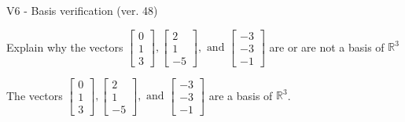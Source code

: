 \begin{exercise}
  \begin{exerciseTitle}V6 - Basis verification (ver. 48)\end{exerciseTitle}
  \begin{exerciseStatement}
    Explain why the vectors \(\left[\begin{array}{r}
0 \\
1 \\
3
\end{array}\right] , \left[\begin{array}{r}
2 \\
1 \\
-5
\end{array}\right] , \text{ and } \left[\begin{array}{r}
-3 \\
-3 \\
-1
\end{array}\right]\) are or are not a basis of \(\mathbb{R}^3\)	


  \end{exerciseStatement}
  \begin{exerciseAnswer}
   The vectors \(\left[\begin{array}{r}
0 \\
1 \\
3
\end{array}\right] , \left[\begin{array}{r}
2 \\
1 \\
-5
\end{array}\right] , \text{ and } \left[\begin{array}{r}
-3 \\
-3 \\
-1
\end{array}\right]\) 
  	 are  a basis of \(\mathbb{R}^3\).
  


  \end{exerciseAnswer}
\end{exercise}